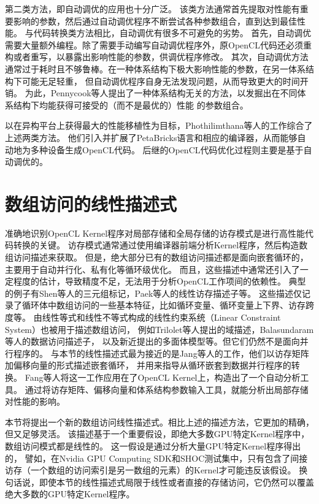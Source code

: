 第二类方法，即自动调优的应用也十分广泛。
该类方法通常首先提取对性能有重要影响的参数，然后通过自动调优程序不断尝试各种参数组合，直到达到最佳性能。
与代码转换类方法相比，自动调优有很多不可避免的劣势。
首先，自动调优需要大量额外编程。除了需要手动编写自动调优程序外，原OpenCL代码还必须重构或者重写，以暴露出影响性能的参数，供调优程序修改。
其次，自动调优方法通常过于耗时且不够鲁棒。在一种体系结构下极大影响性能的参数，在另一体系结构下可能无足轻重，
但自动调优程序自身无法发现问题，从而导致更大的时间开销。
为此，Pennycook等人提出了一种体系结构无关的方法，以发掘出在不同体系结构下均能获得可接受的（而不是最优的）性能
的参数组合。

以在异构平台上获得最大的性能移植性为目标，Phothilimthana等人的工作综合了上述两类方法。
他们引入并扩展了PetaBricks语言和相应的编译器，从而能够自动地为多种设备生成OpenCL代码。
后继的OpenCL代码优化过程则主要是基于自动调优的。

\section{数组访问的线性描述式}
\label{arrayaccessdescriptorsec}
准确地识别OpenCL Kernel程序对局部存储和全局存储的访存模式是进行高性能代码转换的关键。
访存模式通常通过使用编译器前端分析Kernel程序，然后构造数组访问描述来获取。
但是，绝大部分已有的数组访问描述都是面向嵌套循环的，主要用于自动并行化、私有化等循环级优化。
而且，这些描述中通常还引入了一定程度的估计，导致精度不足，无法用于分析OpenCL工作项间的依赖性。
典型的例子有Shen等人的三元组标记，Paek等人的线性访存描述子等。
这些描述仅记录了循环体中数组访问的一些基本特征，比如循环变量、循环变量上下界、访存跨度等。
由线性等式和线性不等式构成的线性约束系统（Linear Constraint System）也被用于描述数组访问，
例如Trilolet等人提出的域描述，Balasundaram等人的数据访问描述子，
以及新近提出的多面体模型等。但它们仍然不是面向并行程序的。
与本节的线性描述式最为接近的是Jang等人的工作，他们以访存矩阵加偏移向量的形式描述嵌套循环，
并用来指导从循环嵌套到数据并行程序的转换。
Fang等人将这一工作应用在了OpenCL Kernel上，构造出了一个自动分析工具。
通过将访存矩阵、偏移向量和体系结构参数输入工具，就能分析出局部存储对性能的影响。

本节将提出一个新的数组访问线性描述式。相比上述的描述方法，它更加的精确，但又足够灵活。
该描述基于一个重要假设，即绝大多数GPU特定Kernel程序中，数组访问模式都是线性的。
这一假设是通过分析大量GPU特定Kernel程序得出的，
譬如，在Nvidia GPU Computing SDK和SHOC测试集中，只有包含了间接访存（一个数组的访问索引是另一数组的元素）的Kernel才可能违反该假设。
换句话说，即使本节的线性描述式局限于线性或者直接的存储访问，它仍然可以覆盖绝大多数的GPU特定Kernel程序。

